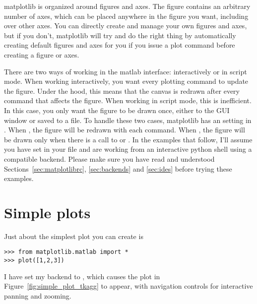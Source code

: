 \documentclass[]{book}
\begin{document}
matplotlib is organized around figures and axes.  The figure contains
an arbitrary number of axes, which can be placed anywhere in the
figure you want, including over other axes.  You can directly create
and manage your own figures and axes, but if you don't, matplotlib
will try and do the right thing by automatically creating default
figures and axes for you if you issue a plot command before creating a
figure or axes. 

There are two ways of working in the matlab interface: interactively
or in script mode.  When working interactively, you want every
plotting command to update the figure.  Under the hood, this means
that the canvas is redrawn after every command that affects the
figure.  When working in script mode, this is inefficient.  In this
case, you only want the figure to be drawn once, either to the GUI
window or saved to a file.  To handle these two cases, matplotlib has
an  setting in .  When
, the figure will be redrawn with each command.
When , the figure will be drawn only when
there is a call to  or .  In the examples
that follow, I'll assume you have set  in your
 file and are working from an interactive python
shell using a compatible backend.  Please make sure you have read and
understood Sections~\ref{sec:matplotlibrc}, \ref{sec:backends} and
\ref{sec:ides} before trying these examples.

\section{Simple plots}
\label{sec:simple_plot}

Just about the simplest plot you can create is

\begin{lstlisting}
>>> from matplotlib.matlab import *
>>> plot([1,2,3])
\end{lstlisting}

\noindent I have set my backend to , which causes
the plot in Figure~\ref{fig:simple_plot_tkagg} to appear, with
navigation controls for interactive panning and zooming.

\end{document}
